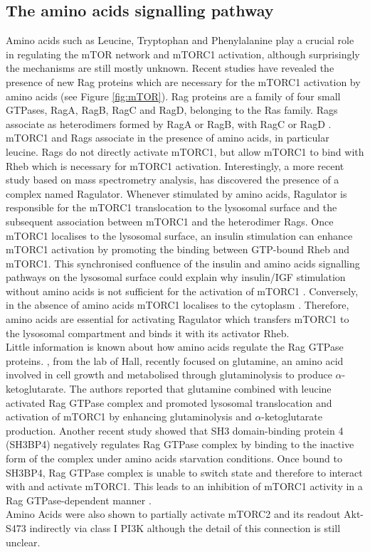 \subsection{The amino acids signalling pathway}
\label{subsec:The amino acids signalling pathway}
Amino acids such as Leucine, Tryptophan and Phenylalanine \citep{Taylor2002, Thedieck2009, Taylor2009} play a crucial role in regulating the mTOR network and mTORC1 activation, although surprisingly the mechanisms are still mostly unknown. Recent studies have revealed the presence of new Rag proteins which are necessary for the mTORC1 activation by amino acids \citep{Kim2008} (see Figure \ref{fig:mTOR}). Rag proteins are a family of four small GTPases, RagA, RagB, RagC and RagD, belonging to the Ras family. Rags associate as heterodimers formed by RagA or RagB, with RagC or RagD \citep{Kim2008, Sancak2008}. mTORC1 and Rags associate in the presence of amino acids, in particular leucine. Rags do not directly activate mTORC1, but allow mTORC1 to bind with Rheb which is necessary for mTORC1 activation. Interestingly, a more recent study \citep{Sancak2010} based on mass spectrometry analysis, has discovered the presence of a complex named Ragulator. Whenever stimulated by amino acids, Ragulator is responsible 
for the mTORC1 translocation to the lysosomal surface and the subsequent association between mTORC1 and the heterodimer Rags. Once mTORC1 localises to the lysosomal surface, an insulin stimulation can enhance mTORC1 activation by promoting the binding between GTP-bound Rheb and mTORC1. This synchronised confluence of the insulin and amino acids signalling pathways on the lysosomal surface could explain why insulin/IGF stimulation without amino acids is not sufficient for the activation of mTORC1 \citep{Drummond2008, Sancak2010}. Conversely, in the absence of amino acids mTORC1 localises to the cytoplasm \citep{Kalender2010}. Therefore, amino acids are essential for activating Ragulator which transfers mTORC1 to the lysosomal compartment and binds it with its activator Rheb. \\
Little information is known about how amino acids regulate the Rag GTPase proteins. \citet{Duran2012_rags}, from the lab of Hall, recently focused on glutamine, an amino acid involved in cell growth and metabolised through glutaminolysis to produce $\alpha$-ketoglutarate. The authors reported that glutamine combined with leucine activated Rag GTPase complex and promoted lysosomal translocation and activation of mTORC1 by enhancing glutaminolysis and $\alpha$-ketoglutarate production. Another recent study showed that SH3 domain-binding protein 4 (SH3BP4) negatively regulates Rag GTPase complex by binding to the inactive form of the complex under amino acids starvation conditions. Once bound to SH3BP4, Rag GTPase complex is unable to switch state and therefore to interact with and activate mTORC1. This leads to an inhibition of mTORC1 activity in a Rag GTPase-dependent manner \citep{Kim2012_SH3BP4}.\\
Amino Acids were also shown to partially activate mTORC2 and its readout Akt-S473 indirectly via class I PI3K  \citep{Jacinto2004, Tato2011Amino} although the detail of this connection is still unclear.

